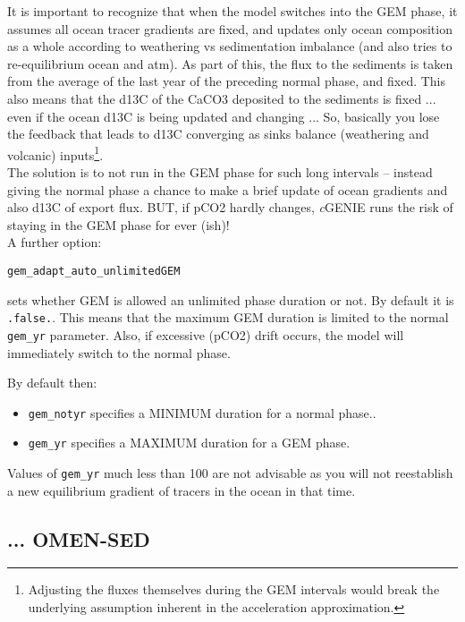 \documentclass[11pt,fleqn]{book} %
\begin{document}
It is important to recognize that when the model switches into the GEM phase, it assumes all ocean tracer gradients are fixed, and updates only ocean composition as a whole according to weathering vs sedimentation imbalance (and also tries to re-equilibrium ocean and atm). As part of this, the flux to the sediments is taken from the average of the last year of the preceding normal phase, and fixed. This also means that the d13C of the CaCO3 deposited to the sediments is fixed ... even if the ocean d13C is being updated and changing ... So, basically you lose the feedback that leads to d13C converging as sinks balance (weathering and volcanic) inputs\footnote{Adjusting the fluxes themselves during the GEM intervals would break the underlying assumption inherent in the acceleration approximation.}.
\\The solution is to not run in the GEM phase for such long intervals -- instead giving the normal phase a chance to make a brief update of ocean gradients and also d13C of export flux. BUT, if pCO2 hardly changes, \textit{c}GENIE runs the risk of staying in the GEM phase for ever (ish)!
\\ A further option:
\vspace{-1mm}\begin{verbatim}
gem_adapt_auto_unlimitedGEM
\end{verbatim}\vspace{-1mm}
sets whether GEM is allowed an unlimited phase duration or not. By default it is \texttt{.false.}. This means that the maximum GEM duration is limited to the normal \texttt{gem\_yr} parameter. Also, if excessive (pCO2) drift occurs, the model will immediately switch to the normal phase.

By default then:
\begin{itemize}
        \item \texttt{gem\_notyr} specifies a MINIMUM duration for a normal phase..
        \item \texttt{gem\_yr} specifies a MAXIMUM duration for a GEM phase.
\end{itemize}
Values of \texttt{gem\_yr} much less than 100 are not advisable as you will not reestablish a new equilibrium gradient of tracers in the ocean in that time.


\newpage
\subsection{... OMEN-SED}\label{HOW-TO_OMEN-SED}
\vspace{2mm}
\end{document}
